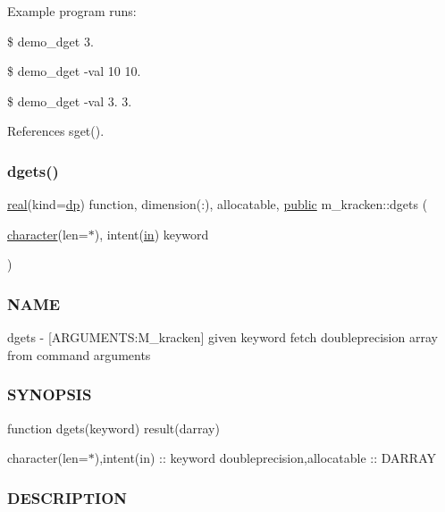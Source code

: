 Example program runs\+:

\$ demo\+\_\+dget 3.

\$ demo\+\_\+dget -\/val 10 10.

\$ demo\+\_\+dget -\/val 3. 3. 

References sget().

\mbox{\label{namespacem__kracken_a76e99048e7fb6010dcb7173ef958c932}} 
\subsubsection{\texorpdfstring{dgets()}{dgets()}}
{\footnotesize\ttfamily \hyperlink{read__watch_83_8txt_abdb62bde002f38ef75f810d3a905a823}{real}(kind=\hyperlink{namespacem__kracken_a1de91e5ca55bf4fab118936bf4fad36a}{dp}) function, dimension(\+:), allocatable, \hyperlink{M__stopwatch_83_8txt_a2f74811300c361e53b430611a7d1769f}{public} m\+\_\+kracken\+::dgets (\begin{DoxyParamCaption}\item[{\hyperlink{option__stopwatch_83_8txt_abd4b21fbbd175834027b5224bfe97e66}{character}(len=$\ast$), intent(\hyperlink{M__journal_83_8txt_afce72651d1eed785a2132bee863b2f38}{in})}]{keyword }\end{DoxyParamCaption})}



\subsubsection*{N\+A\+ME}

dgets -\/ \mbox{[}A\+R\+G\+U\+M\+E\+N\+TS\+:M\+\_\+kracken\mbox{]} given keyword fetch doubleprecision array from command arguments \subsubsection*{S\+Y\+N\+O\+P\+S\+IS}

function dgets(keyword) result(darray)

character(len=$\ast$),intent(in) \+:\+: keyword doubleprecision,allocatable \+:\+: D\+A\+R\+R\+AY

\subsubsection*{D\+E\+S\+C\+R\+I\+P\+T\+I\+ON}

